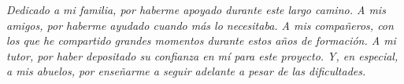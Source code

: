 \begin{flushright}
\textit{Dedicado a mi familia, por haberme apoyado durante este largo camino.
A mis amigos, por haberme ayudado cuando más lo necesitaba.
A mis compañeros, con los que he compartido grandes momentos durante estos años de formación.
A mi tutor, por haber depositado su confianza en mí para este proyecto.
Y, en especial, a mis abuelos, por enseñarme a seguir adelante a pesar de las dificultades.}
\end{flushright}
\newpage
\thispagestyle{empty}
\hspace*{0.5cm}
\newpage
